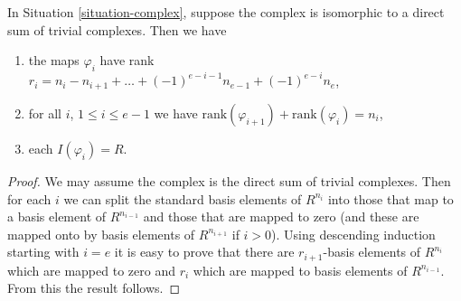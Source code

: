 \begin{lemma}
\label{lemma-trivial-case-exact}
In Situation \ref{situation-complex}, suppose the complex is
isomorphic to a direct sum of trivial complexes. Then
we have
\begin{enumerate}
\item the maps $\varphi_i$ have rank
$r_i = n_i - n_{i + 1} + \ldots + (-1)^{e-i-1} n_{e-1} + (-1)^{e-i} n_e$,
\item for all $i$, $1 \leq i \leq e - 1$ we have
$\text{rank}(\varphi_{i + 1}) + \text{rank}(\varphi_i) = n_i$,
\item each $I(\varphi_i) = R$.
\end{enumerate}
\end{lemma}

\begin{proof}
We may assume the complex is the direct sum of trivial
complexes. Then for each $i$ we can split the standard basis
elements of $R^{n_i}$ into those that map to a basis element
of $R^{n_{i-1}}$ and those that are mapped to zero (and these
are mapped onto by basis elements of $R^{n_{i + 1}}$ if $i > 0$).
Using descending
induction starting with $i = e$ it is easy to prove that there
are $r_{i + 1}$-basis elements of $R^{n_i}$ which are mapped
to zero and $r_i$ which are mapped to basis elements of
$R^{n_{i-1}}$. From this the result follows.
\end{proof}
